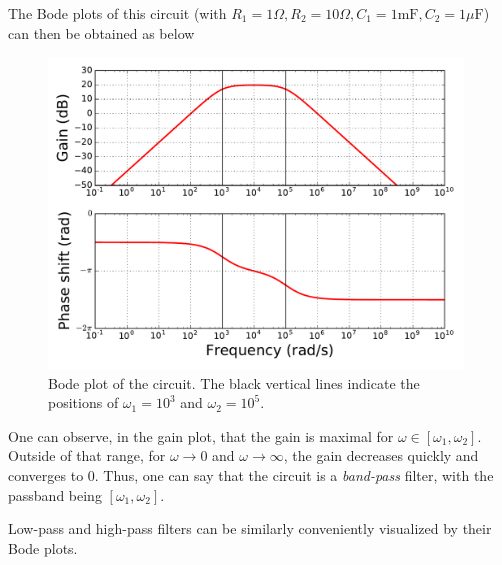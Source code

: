 \documentclass[a4paper,11pt]{report}
\theoremstyle{definition}
\begin{document}
The Bode plots of this circuit (with $R_1=1\Omega, R_2=10\Omega,
C_1=1\textrm{mF}, C_2=1\mu\textrm{F}$) can then be obtained as below


\begin{figure}[H]
  \centering
  \includegraphics[width=11cm]{fig/circuit-bode.pdf}
  \caption{Bode plot of the circuit. The black vertical lines indicate
  the positions of $\omega_1=10^3$ and $\omega_2=10^5$.}
  \label{fig:circuit-bode}
\end{figure}

One can observe, in the gain plot, that the gain is maximal for
$\omega\in[\omega_1,\omega_2]$. Outside of that range, for
$\omega\to 0$ and $\omega\to\infty$, the gain decreases quickly and
converges to 0. Thus, one can say that the circuit is a
\emph{band-pass} filter, with the passband being
$[\omega_1,\omega_2]$.

Low-pass and high-pass filters can be similarly conveniently
visualized by their Bode plots.
\end{document}

